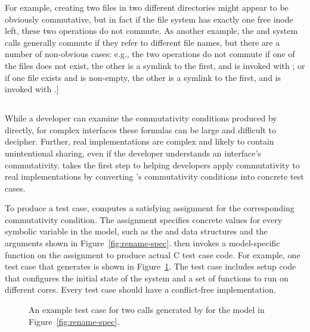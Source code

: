 For
example, creating two files in two different directories might appear to
be obviously commutative, but in fact if the file system has exactly one
free inode left, these two operations do not commute.
%
As another example, the  and  system calls
generally commute if they refer to different file names, but there are a
number of non-obvious cases: e.g., the two operations do not commute if one
of the files does not exist, the other is a symlink to the first, and
 is invoked with ; or if one file exists and is
non-empty, the other is a symlink to the first, and  is invoked
with .]


\subsection{\generator{}}
\label{sec:model:generator}

\cbstart While a developer can examine the commutativity conditions
produced by \analyzer directly, for complex interfaces these formulas
can be large and difficult to decipher.  Further, real implementations
are complex and likely to contain unintentional sharing, even if the
developer understands an interface's commutativity.  \generator takes
the first step to helping developers apply commutativity to real
implementations by converting \analyzer's commutativity conditions into
concrete test cases. \cbend

To produce a test case, \generator computes
a satisfying assignment for the corresponding commutativity condition.
The assignment specifies concrete values for every symbolic variable in
the model, such as the  and  data structures
and the  arguments shown in Figure~\ref{fig:rename-spec}.
\generator then invokes a model-specific function on the assignment
to produce actual C test case code.  For example, one test
case that \generator{} generates is shown in Figure~\ref{fig:testgen}.
The test case includes setup code that configures the initial state of
the system and a set of functions to run on different cores. Every
\generator test case should have a conflict-free implementation.

\begin{figure}
\begin{small}

\end{small}
\caption{An example test case for two  calls generated by
         \generator{} for the model in Figure~\ref{fig:rename-spec}.}
\label{fig:testgen}
\end{figure}

